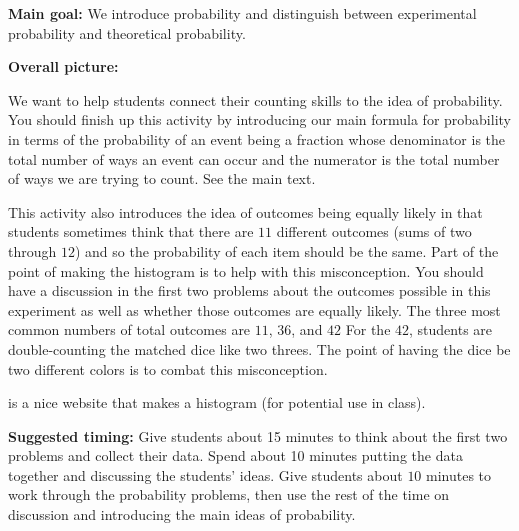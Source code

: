 \documentclass[noauthor,nooutcomes,handout]{ximera}
\begin{document}
\begin{instructorNotes}
{\bf Main goal:} We introduce probability and distinguish between experimental probability and theoretical probability.

{\bf Overall picture:} 

We want to help students connect their counting skills to the idea of probability. You should finish up this activity by introducing our main formula for probability in terms of the probability of an event being a fraction whose denominator is the total number of ways an event can occur and the numerator is the total number of ways we are trying to count.  See the main text.

This activity also introduces the idea of outcomes being equally likely in that students sometimes think that there are $11$ different outcomes (sums of two through $12$) and so the probability of each item should be the same. Part of the point of making the histogram is to help with this misconception. You should have a discussion in the first two problems about the outcomes possible in this experiment as well as whether those outcomes are equally likely.  The three most common numbers of total outcomes are $11$, $36$, and $42$ For the $42$, students are double-counting the matched dice like two threes. The point of having the dice be two different colors is to combat this misconception.

 is a nice website that makes a histogram (for potential use in class).

{\bf Suggested timing:} Give students about 15 minutes to think about the first two problems and collect their data. Spend about 10 minutes putting the data together and discussing the students' ideas. Give students about $10$ minutes to work through the probability problems, then use the rest of the time on discussion and introducing the main ideas of probability.


\end{instructorNotes}
\end{document}
